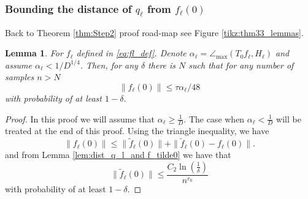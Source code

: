 \documentclass[12pt]{article}
\newtheorem{Lemma}[Theorem]{Lemma}
\theoremstyle{remark}
\newcommand{\DD}{\mathcal{D}}
\newcommand{\eps}{\varepsilon}
\newcommand{\wtilde}[1]{\widetilde{#1}}
\newcommand{\maxangle}{\angle_{\max}}
\begin{document}
\begin{appendices}

\subsubsection{Bounding the distance of $q_\ell$ from $f_\ell(0)$}\label{sec:f0_est}


Back to Theorem \ref{thm:Step2} proof road-map see Figure \ref{tikz:thm33_lemmas}.

\begin{Lemma}\label{lem:dist_to_f_l0_weak}
For $f_\ell$ defined in \eqref{eq:fl_def}. Denote 
$\alpha_\ell = \maxangle (T_0f_{\ell}, H_{\ell})$ and assume $\alpha_\ell<1/D^{1/4}$. Then,
for any $\delta$ there is $N$ such that for any number of samples $n > N$
\[
\|f_\ell(0)\| \leq \tau \alpha_\ell /48
\]
with probability of at least $1-\delta$.
\end{Lemma}
\begin{proof}
In this proof we will assume that $\alpha_\ell  \geq\frac{1}{D}$. The case when $\alpha_\ell <\frac{1}{D}$ will be treated at the end of this proof.
Using the triangle inequality, we have 
    \begin{equation}\label{eq:f_ell0_triangle}
        \|f_\ell(0)\| \leq \| \wtilde{f}_\ell(0) \| + \| \wtilde{f}_\ell(0)  - f_\ell(0)\|.
    \end{equation}
    and from Lemma \ref{lem:dist_q_l_and f_tilde0} we have that 
    \begin{equation}\label{eq:f_tilde0_bound_stone}
            \| \wtilde{f}_\ell(0)\| \leq \frac{C_2\ln\left(\frac{1}{\delta}\right)}{n^{r_0}}
    \end{equation}
    with probability of at least $1-\delta$.
    

\end{proof}
\end{appendices}
\end{document}
